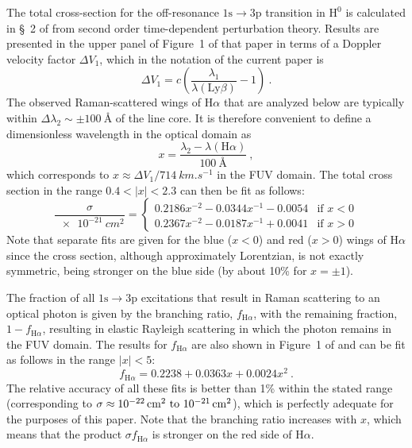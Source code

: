 \documentclass[times]{aastex63}
\newcommand*\chem[1]{\ensuremath{\mathrm{#1}}}
\newcommand\Config[1]{\ensuremath{\mathrm{#1}}}
\newcommand\ha{\ensuremath{\text{H}\alpha}}
\newcommand\lyb{\ensuremath{\text{Ly}\beta}}
\begin{document}
The total cross-section for the off-resonance \Config{1s \to 3p}
transition in \chem{H^0} is calculated in \S~2 of \citet{Chang:2015a}
from second order time-dependent perturbation theory. Results are
presented in the upper panel of Figure~1 of that paper in terms of a
Doppler velocity factor \(\Delta V_1\), which in the notation of the
current paper is
\begin{equation}
  \label{eq:chang-DeltaV1}
  \Delta V_1 = c \left( \frac{\lambda_1}{\lambda(\lyb)} - 1 \right) \ .
\end{equation}
The observed Raman-scattered wings of \ha{} that are analyzed below
are typically within \(\Delta\lambda_2 \sim \pm \SI{100}{\angstrom}\) of the line
core.  It is therefore convenient to define a dimensionless wavelength
in the optical domain as
\begin{equation}
  \label{eq:x-optical-def}
  x = \frac{\lambda_2 - \lambda(\ha)}{\SI{100}{\angstrom}} \ ,
\end{equation}
which corresponds to \(x \approx \Delta V_1 / \SI{714}{km.s^{-1}}\) in the FUV
domain.  The total cross section in the range \(0.4 < |x| < 2.3\) can
then be fit as follows:
\begin{equation}
  \label{eq:total-cross-section-fit}
  \frac{\sigma}{\SI{e-21}{cm^2}} =  
  \begin{cases}
    0.2186 x^{-2} - 0.0344 x^{-1} - 0.0054 & \text{if \(x < 0\)} \\
    0.2367 x^{-2} - 0.0187 x^{-1} + 0.0041 & \text{if \(x > 0\)} 
  \end{cases}
\end{equation}
Note that separate fits are given for the blue (\(x < 0\)) and red
(\(x > 0\)) wings of \ha{} since the cross section, although
approximately Lorentzian, is not exactly symmetric, being stronger on
the blue side (by about 10\% for \(x = \pm 1\)).

The fraction of all \Config{1s \to 3p} excitations that result in Raman
scattering to an optical photon is given by the branching ratio,
\(f_{\ha}\), with the remaining fraction, \(1 - f_{\ha}\), resulting
in elastic Rayleigh scattering in which the photon remains in the FUV
domain.  The results for \(f_{\ha}\) are also shown in Figure~1 of
\citet{Chang:2015a} and can be fit as follows in the range
\(|x| < 5\):
\begin{equation}
  \label{eq:fha-fit}
  f_{\ha} = 0.2238 + 0.0363 x + 0.0024 x^2 \ .
\end{equation}
The relative accuracy of all these fits is better than 1\% within the
stated range (corresponding to
\(\sigma \approx \text{\SIrange{e-22}{e-21}{cm^2}}\)), which is perfectly
adequate for the purposes of this paper.  Note that the branching
ratio increases with \(x\), which means that the product
\(\sigma f_{\ha} \) is stronger on the red side of \ha{}.
\end{document}
